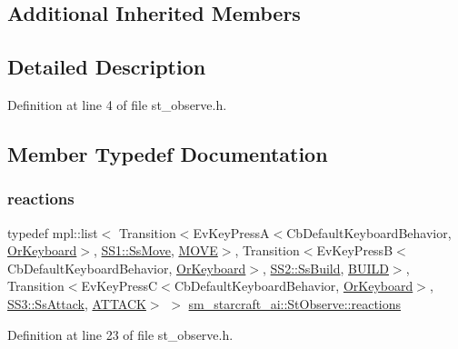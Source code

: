 \subsection*{Additional Inherited Members}


\subsection{Detailed Description}


Definition at line 4 of file st\+\_\+observe.\+h.



\subsection{Member Typedef Documentation}
\mbox{\label{structsm__starcraft__ai_1_1StObserve_ad3194a0d80ad2e5f716d6821abc0a551}} 
\subsubsection{\texorpdfstring{reactions}{reactions}}
{\footnotesize\ttfamily typedef mpl\+::list$<$ Transition$<$Ev\+Key\+PressA$<$Cb\+Default\+Keyboard\+Behavior, \hyperlink{classsm__starcraft__ai_1_1OrKeyboard}{Or\+Keyboard}$>$, \hyperlink{structsm__starcraft__ai_1_1SS1_1_1SsMove}{S\+S1\+::\+Ss\+Move}, \hyperlink{structsm__starcraft__ai_1_1StObserve_1_1MOVE}{M\+O\+VE}$>$, Transition$<$Ev\+Key\+PressB$<$Cb\+Default\+Keyboard\+Behavior, \hyperlink{classsm__starcraft__ai_1_1OrKeyboard}{Or\+Keyboard}$>$, \hyperlink{structsm__starcraft__ai_1_1SS2_1_1SsBuild}{S\+S2\+::\+Ss\+Build}, \hyperlink{structsm__starcraft__ai_1_1StObserve_1_1BUILD}{B\+U\+I\+LD}$>$, Transition$<$Ev\+Key\+PressC$<$Cb\+Default\+Keyboard\+Behavior, \hyperlink{classsm__starcraft__ai_1_1OrKeyboard}{Or\+Keyboard}$>$, \hyperlink{structsm__starcraft__ai_1_1SS3_1_1SsAttack}{S\+S3\+::\+Ss\+Attack}, \hyperlink{structsm__starcraft__ai_1_1StObserve_1_1ATTACK}{A\+T\+T\+A\+CK}$>$ $>$ \hyperlink{structsm__starcraft__ai_1_1StObserve_ad3194a0d80ad2e5f716d6821abc0a551}{sm\+\_\+starcraft\+\_\+ai\+::\+St\+Observe\+::reactions}}



Definition at line 23 of file st\+\_\+observe.\+h.



